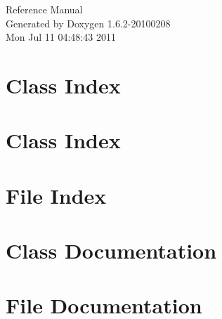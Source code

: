 \documentclass[a4paper]{book}
\begin{document}
\hypersetup{pageanchor=false}
\begin{titlepage}
\vspace*{7cm}
\begin{center}
{\Large Reference Manual}\\
\vspace*{1cm}
{\large Generated by Doxygen 1.6.2-20100208}\\
\vspace*{0.5cm}
{\small Mon Jul 11 04:48:43 2011}\\
\end{center}
\end{titlepage}
\clearemptydoublepage
{}
\tableofcontents
\clearemptydoublepage
{}
\hypersetup{pageanchor=true}
\chapter{Class Index}

\chapter{Class Index}

\chapter{File Index}

\chapter{Class Documentation}























\chapter{File Documentation}



















\printindex
\end{document}
